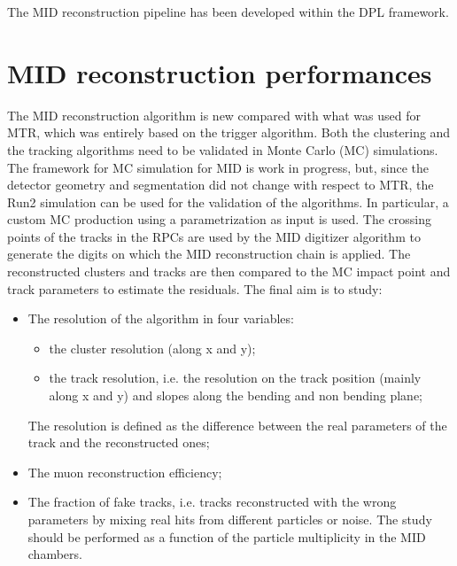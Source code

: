 The MID reconstruction pipeline has been developed within the DPL framework.

\section{MID reconstruction performances}
The MID reconstruction algorithm is new compared with what was used for MTR, which was entirely based on the trigger algorithm.
Both the clustering and the tracking algorithms need to be validated in Monte Carlo (MC) simulations. 
The framework for MC simulation for MID is work in progress, but, since the detector geometry and segmentation did not change with respect to MTR, the Run2 simulation can be used for the validation of the algorithms. 
In particular, a custom MC production using a \jpsi parametrization as input is used. 
The crossing points of the tracks in the RPCs are used by the MID digitizer algorithm to generate the digits on which the MID reconstruction chain is applied. 
The reconstructed clusters and tracks are then compared to the MC impact point and track parameters to estimate the residuals. 
The final aim is to study:
\begin{itemize}
    \item The resolution of the algorithm in four variables: 
    \begin{itemize}
        \item the cluster resolution (along x and y);
        \item the track resolution, i.e. the resolution on the track position (mainly along x and y) and slopes along the bending and non bending plane;
    \end{itemize}
    The resolution is defined as the difference between the real parameters of the track and the reconstructed ones;
    \item The muon reconstruction efficiency;
    \item The fraction of fake tracks, i.e. tracks reconstructed with the wrong parameters by mixing real hits from different particles or noise. The study should be performed as a function of the particle multiplicity in the MID chambers.
\end{itemize}

